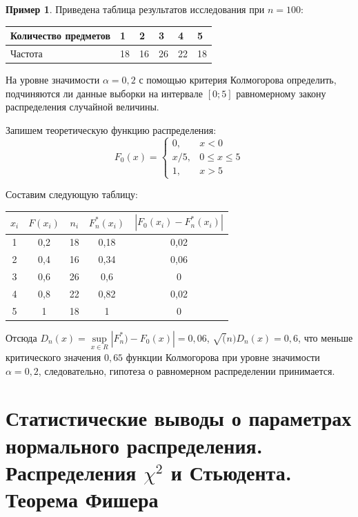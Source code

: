 \documentclass[oneside,final,14pt]{extreport}
\theoremstyle{plain}
\theoremstyle{definition}
\newtheorem*{exmp}{Пример}
\theoremstyle{named}
\begin{document}
\begin{exmp}
Приведена таблица результатов исследования при $n=100$:
\begin{center}
    \begin{tabular}{|l|l|l|l|l|l|}
    \hline Количество предметов & 1 & 2 & 3 & 4 & 5 \\
    \hline Частота & 18 & 16 & 26 & 22 & 18 \\
    \hline
\end{tabular}
\end{center}
На уровне значимости $\alpha=0,2$ с помощью критерия Колмогорова определить, подчиняются ли данные выборки на интервале $[0;5]$ равномерному закону распределения случайной величины.

Запишем теоретическую функцию распределения:
\begin{equation*}
    F_{0}(x)=\left\{\begin{array}{cc}
    0, & x<0 \\
    x/5, & 0 \leqslant x \leqslant 5 \\
    1, & x>5
    \end{array}\right.
\end{equation*}

Составим следующую таблицу:
\begin{center}
    \begin{tabular}{|c|c|c|c|c|}
    \hline $x_{i}$ & $F(x_{i})$ & $n_{i}$ & $F^{*}_{n}(x_{i})$ & $|F_{0}(x_{i})-F^{*}_{n}(x_{i})|$ \\
    \hline 1 & 0,2 & 18 & 0,18 & 0,02 \\
    \hline 2 & 0,4 & 16 & 0,34 & 0,06 \\
    \hline 3 & 0,6 & 26 & 0,6 & 0 \\
    \hline 4 & 0,8 & 22 & 0,82 & 0,02 \\
    \hline 5 & 1 & 18 & 1 & 0 \\
\hline
\end{tabular}
\end{center}
Отсюда $D_{n}(x)=\sup\limits_{x \in R}\left|F_{n}^{*})-F_{0}(x)\right| = 0,06$, $\sqrt(n)D_{n}(x) = 0,6$, что меньше критического значения $0,65$ функции Колмогорова при уровне значимости $\alpha=0,2$, следовательно, гипотеза о равномерном распределении принимается.
\end{exmp}

\section{Статистические выводы о параметрах нормального распределения. Распределения $\chi^{2}$ и Стьюдента. Теорема Фишера}
\end{document}
